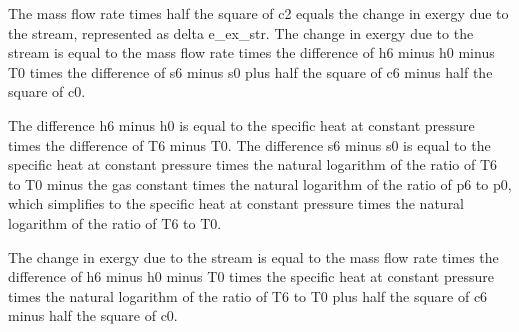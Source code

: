 The mass flow rate times half the square of c2 equals the change in exergy due to the stream, represented as delta e_ex_str. The change in exergy due to the stream is equal to the mass flow rate times the difference of h6 minus h0 minus T0 times the difference of s6 minus s0 plus half the square of c6 minus half the square of c0.

The difference h6 minus h0 is equal to the specific heat at constant pressure times the difference of T6 minus T0. The difference s6 minus s0 is equal to the specific heat at constant pressure times the natural logarithm of the ratio of T6 to T0 minus the gas constant times the natural logarithm of the ratio of p6 to p0, which simplifies to the specific heat at constant pressure times the natural logarithm of the ratio of T6 to T0.

The change in exergy due to the stream is equal to the mass flow rate times the difference of h6 minus h0 minus T0 times the specific heat at constant pressure times the natural logarithm of the ratio of T6 to T0 plus half the square of c6 minus half the square of c0.